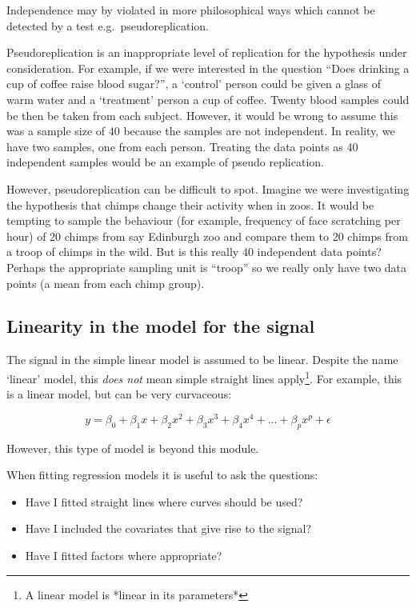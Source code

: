 \documentclass[
  oneside]{krantz}
\providecommand{\tightlist}{%
  \setlength{\itemsep}{0pt}\setlength{\parskip}{0pt}}
\begin{document}
Independence may by violated in more philosophical ways which cannot be detected by a test e.g.~pseudoreplication.

Pseudoreplication is an inappropriate level of replication for the hypothesis under consideration. For example, if we were interested in the question ``Does drinking a cup of coffee raise blood sugar?'', a `control' person could be given a glass of warm water and a `treatment' person a cup of coffee. Twenty blood samples could be then be taken from each subject. However, it would be wrong to assume this was a sample size of 40 because the samples are not independent. In reality, we have two samples, one from each person. Treating the data points as 40 independent samples would be an example of pseudo replication.

However, pseudoreplication can be difficult to spot. Imagine we were investigating the hypothesis that chimps change their activity when in zoos. It would be tempting to sample the behaviour (for example, frequency of face scratching per hour) of 20 chimps from say Edinburgh zoo and compare them to 20 chimps from a troop of chimps in the wild. But is this really 40 independent data points? Perhaps the appropriate sampling unit is ``troop'' so we really only have two data points (a mean from each chimp group).

\hypertarget{linearity-in-the-model-for-the-signal}{%
\subsection{Linearity in the model for the signal}\label{linearity-in-the-model-for-the-signal}}

The signal in the simple linear model is assumed to be linear. Despite the name `linear' model, this \emph{does not} mean simple straight lines apply\footnote{A linear model is *linear in its parameters*}. For example, this is a linear model, but can be very curvaceous:

\[
y = \beta_0 + \beta_1 x + \beta_2 x^2 + \beta_3 x^3 + \beta_4 x^4 + ... + \beta_p x^p + \epsilon
\]

However, this type of model is beyond this module.

When fitting regression models it is useful to ask the questions:

\begin{itemize}
\tightlist
\item
  Have I fitted straight lines where curves should be used?
\item
  Have I included the covariates that give rise to the signal?
\item
  Have I fitted factors where appropriate?
\end{itemize}
\end{document}
